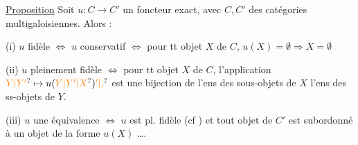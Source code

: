 \uline{Proposition} Soit $u:C\longrightarrow C'$ un foncteur exact, avec $C,C'$ des catégories multigaloisiennes. Alors :

(i) $u$ fidèle $\Longleftrightarrow$ $u$ conservatif $\Longleftrightarrow$ pour tt objet $X$ de $C$, $u(X)=\emptyset\Longrightarrow X=\emptyset$

(ii) $u$ pleinement fidèle $\Longleftrightarrow$ pour tt objet $X$ de $C$,  l'application $\unsure{Y|Y'}\mapsto u(\unsure{Y|Y'|X})\unsure{'|,}$ est une bijection de l'ens des sous-objets de $X$  l'ens des ss-objets de $Y$.


(iii) $u$ une équivalence $\Longleftrightarrow$ $u$ est pl. fidèle (cf ) et tout objet de $C'$ est subordonné à un objet de la forme $u(X)$ \ldots.

